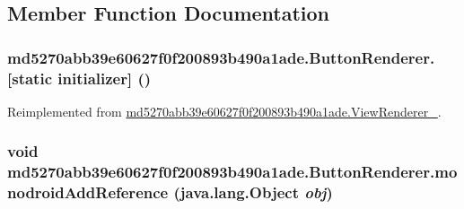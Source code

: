 \subsection{Member Function Documentation}
\hypertarget{classmd5270abb39e60627f0f200893b490a1ade_1_1_button_renderer_185a2314a4c48ba4c84aff8feb113b1e}{
\subsubsection[{[static initializer]}]{\setlength{\rightskip}{0pt plus 5cm}md5270abb39e60627f0f200893b490a1ade.ButtonRenderer.\mbox{[}static initializer\mbox{]} ()}}
\label{classmd5270abb39e60627f0f200893b490a1ade_1_1_button_renderer_185a2314a4c48ba4c84aff8feb113b1e}




Reimplemented from \hyperlink{classmd5270abb39e60627f0f200893b490a1ade_1_1_view_renderer__2_30528b2f26688d4ae24a58b2a1865a93}{md5270abb39e60627f0f200893b490a1ade.ViewRenderer\_}.\hypertarget{classmd5270abb39e60627f0f200893b490a1ade_1_1_button_renderer_777673af96186211dacdc043e03e29c4}{
\subsubsection[{monodroidAddReference}]{\setlength{\rightskip}{0pt plus 5cm}void md5270abb39e60627f0f200893b490a1ade.ButtonRenderer.monodroidAddReference (java.lang.Object {\em obj})}}
\label{classmd5270abb39e60627f0f200893b490a1ade_1_1_button_renderer_777673af96186211dacdc043e03e29c4}




